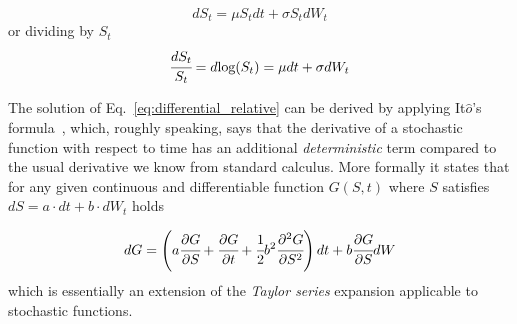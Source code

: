 \begin{equation}
dS_t = \mu S_t dt + \sigma S_t dW_t
\label{eq:differential}
\end{equation}
or dividing by $S_t$
\begin{equation}
\cfrac{dS_t}{S_t} = d\textrm{log}(S_t) = \mu dt + \sigma dW_t
\label{eq:differential_relative}
\end{equation}

The solution of Eq.~\ref{eq:differential_relative} can be derived by applying It$\hat{o}$'s formula~\cite{bib:ito_lemma}, which, roughly speaking, says that the derivative of a stochastic function with respect to time has an additional \emph{deterministic} term compared to the usual derivative we know from standard calculus. More formally it states that for any given continuous and differentiable function $G(S, t)$ where $S$ satisfies $dS=a\cdot dt +b\cdot dW_t$ holds

\begin{equation}
dG = \left(a\cfrac{\partial G}{\partial S} + \cfrac{\partial G}{\partial t} + \cfrac{1}{2}b^2\cfrac{\partial^2 G}{\partial S^2} \right)dt + b \cfrac{\partial G}{\partial S}dW
\label{eq:itos_lemma}
\end{equation}
which is essentially an extension of the \emph{Taylor series} expansion applicable to stochastic functions.

